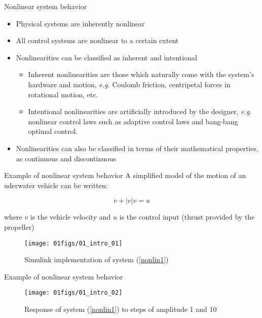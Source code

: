 \documentclass{beamer}
\begin{document}
\begin{frame}{Nonlinear system behavior}
\begin{itemize}
	\item Physical systems are inherently nonlinear							\vspace{1em}
	
	\item All control systems are nonlinear to a certain extent					\vspace{1em}
	
	\item Nonlinearities can be classified as inherent and intentional
		\begin{itemize}
			\item Inherent nonlinearities are those which naturally come with the system's hardware and motion, \emph{e.g.} Coulomb friction, centripetal forces in rotational motion, etc.
			\item Intentional nonlinearities are artificially introduced by the designer, \emph{e.g.} nonlinear control laws such as adaptive control laws and bang-bang optimal control.
		\end{itemize}													\vspace{1em}
	
	\item Nonlinearities can also be classified in terms of their mathematical properties, as continuous and discontinuous
\end{itemize}
\end{frame}

\begin{frame}{Example of nonlinear system behavior}
A simplified model of the motion of an uderwater vehicle can be written:

\begin{equation} \label{nonlin1}
	\dot{v} + |v|v = u
\end{equation}

where $v$ is the vehicle velocity and $u$ is the control input (thrust provided by the propeller)

\begin{figure}[h]
	\begin{center}
		\texttt{[image: 01figs/01\_intro\_01]}
		\caption{Simulink implementation of system (\ref{nonlin1})}
	\end{center}
\end{figure}
\end{frame}

\begin{frame}{Example of nonlinear system behavior}
\begin{figure}[h]
	\begin{center}
		\texttt{[image: 01figs/01\_intro\_02]}
		\caption{Response of system (\ref{nonlin1}) to steps of amplitude 1 and 10}
	\end{center}
\end{figure}
\end{frame}
\end{document}
